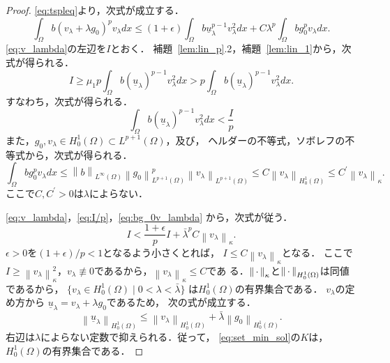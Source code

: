 \begin{proof}
 \eqref{eq:tspleq}より，次式が成立する．
 \begin{equation}
  \int_\Omega b (v_\lambda + \lambda g_0)^p v_\lambda dx 
   \leq (1 + \epsilon) \int_\Omega b \underline{u}_\lambda ^{p-1}
   v_\lambda^2 dx + C \lambda^p \int_\Omega bg_0^p v_\lambda dx.
   \label{eq:v_lambda_I}
 \end{equation}
 \eqref{eq:v_lambda}の左辺を$I$とおく．
 補題~\ref{lem:lin_p}.2，補題~\ref{lem:lin_1}から，次式が得られる．
 \[
  I \geq \mu_1 p \int_\Omega b (\underline{u}_\lambda)^{p-1}
 v_\lambda^2 dx > p \int_\Omega b (\underline{u}_\lambda)^{p-1}
 v_\lambda^2 dx.
 \]
 すなわち，次式が得られる．
 \begin{equation}
  \int_\Omega b(\underline{u}_\lambda)^{p-1} v_\lambda^2 dx <
   \frac{I}{p} \label{eq:I/p}
 \end{equation}
 また，$g_0, v_\lambda \in H_0^1(\Omega) \subset L^{p+1}(\Omega)$，及び，
 ヘルダーの不等式，ソボレフの不等式から，次式が得られる．
 \begin{equation}
  \int_\Omega b g_0^p v_\lambda dx \leq 
   \left\| b  \right\|_{L^\infty(\Omega)}
   \left\| g_0 \right\|_{L^{p+1}(\Omega)}^p 
   \left\| v_\lambda \right\|_{L^{p+1}(\Omega)}
   \leq C \left\| v_\lambda \right\|_{H_0^1(\Omega)}
   \leq C^\prime \left\| v_\lambda \right\|_{\kappa}.
   \label{eq:bg_0v_lambda}
 \end{equation}
 ここで$C, C^\prime > 0$は$\lambda$によらない．

 \eqref{eq:v_lambda}，\eqref{eq:I/p}，\eqref{eq:bg_0v_lambda}
 から，次式が従う．
 \[
  I < \frac{1 + \epsilon}{p} I + \bar{\lambda}^p C \left\|
 v_\lambda \right\|_{\kappa}.
 \]
 $\epsilon > 0$を$(1+\epsilon)/p < 1$となるよう小さくとれば，
 $I \leq C \left\| v_\lambda \right\|_\kappa$となる．
 ここで$I \geq \left\| v_\lambda \right\|_\kappa^2$，$v_\lambda \not
 \equiv 0$であるから，$\left\| v_\lambda \right\|_{\kappa} \leq C$であ
 る．$\left\|\, \cdot \, \right\|_\kappa$と$\left\|\, \cdot \, \right\|_{H_0^1(\Omega)}$は同値であるから，
 $\{ v_\lambda \in H_0^1(\Omega) \mid 0 < \lambda < \bar{\lambda} \}$
 は$H_0^1(\Omega)$の有界集合である．
 $v_\lambda$の定め方から
 $\underline{u}_\lambda = v_\lambda + \lambda g_0$であるため，
 次の式が成立する．
 \[
  \left\| \underline{u}_\lambda \right\|_{H_0^1(\Omega)} 
 \leq \left\| v_\lambda \right\|_{H_0^1(\Omega)}
 + \bar{\lambda} \left\| g_0 \right\|_{H_0^1(\Omega)}.
 \]
 右辺は$\lambda$によらない定数で抑えられる．従って，
 \eqref{eq:set_min_sol}の$K$は，$H_0^1(\Omega)$の有界集合である．\qedhere
\end{proof}


